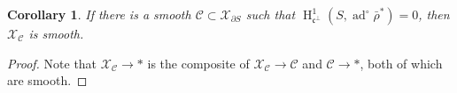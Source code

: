 \documentclass{article}
\DeclareMathOperator{\adjoint}{ad}
\DeclareMathOperator{\h}{H}
\newcommand{\cC}{\mathcal{C}}
\newcommand{\cX}{\mathcal{X}}
\newcommand{\fc}{\mathfrak{c}}
\newtheorem{corollary}[subsection]{Corollary}
\begin{document}
\begin{corollary}
If there is a smooth $\cC\subset \cX_{\partial S}$ such that 
$\h_{\fc^\bot}^1(S,\adjoint^\circ\bar\rho^\ast)=0$, then $\cX_\cC$ is smooth.  
\end{corollary}
\begin{proof}
Note that $\cX_\cC\to \ast$ is the composite of $\cX_\cC\to \cC$ and 
$\cC\to \ast$, both of which are smooth. 
\end{proof}
\end{document}
